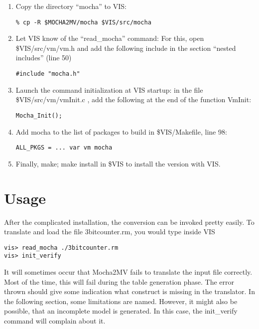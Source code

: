 \documentclass[a4paper,12pt]{article}
\begin{document}
\begin{enumerate}
\item Copy the directory ``mocha'' to VIS:

\begin{verbatim}
% cp -R $MOCHA2MV/mocha $VIS/src/mocha
\end{verbatim}

\item Let VIS know of the ``read\_mocha'' command: For this, open
\$VIS/src/vm/vm.h and add the following include in the section ``nested
includes'' (line 50)

\begin{verbatim}
#include "mocha.h"
\end{verbatim}

\item Launch the command initialization at VIS startup: in the file
\$VIS/src/vm/vmInit.c , add the following at the end of the function
VmInit:

\begin{verbatim}
Mocha_Init();
\end{verbatim}

\item Add mocha to the list of packages to build in \$VIS/Makefile, line 98:

\begin{verbatim}
ALL_PKGS = ... var vm mocha
\end{verbatim}

\item Finally, make; make install in \$VIS to install the
version with VIS.
\end{enumerate}

\section{Usage}
After the complicated installation, the conversion can be invoked pretty
easily. To translate and load the file 3bitcounter.rm, you would type inside
VIS

\begin{verbatim}
vis> read_mocha ./3bitcounter.rm
vis> init_verify
\end{verbatim}

It will sometimes occur that Mocha2MV fails to translate the input file
correctly. Most of the time, this will fail during the table generation
phase. The error thrown should give some indication what construct is
missing in the translator. In the following section, some limitations
are named. However, it might also be possible, that an incomplete model is
generated. In this case, the init\_verify command will complain about it.
\end{document}

